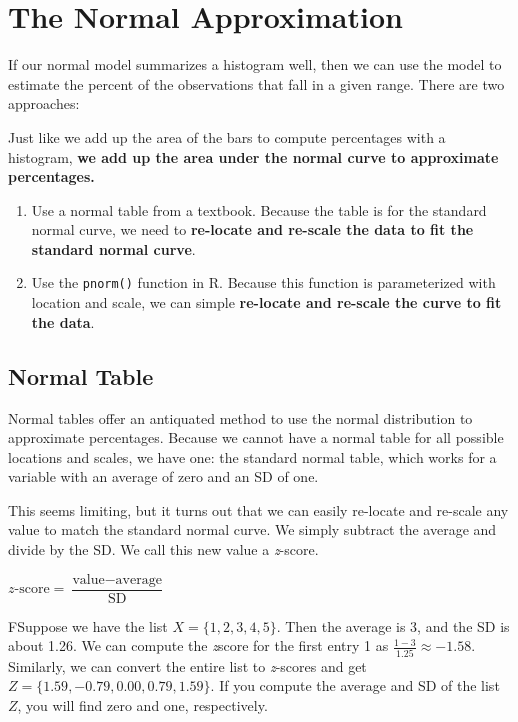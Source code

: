 \documentclass[]{book}
\providecommand{\tightlist}{%
  \setlength{\itemsep}{0pt}\setlength{\parskip}{0pt}}
\begin{document}
\hypertarget{the-normal-approximation}{%
\section{The Normal Approximation}\label{the-normal-approximation}}

If our normal model summarizes a histogram well, then we can use the model to estimate the percent of the observations that fall in a given range. There are two approaches:

Just like we add up the area of the bars to compute percentages with a histogram, \textbf{we add up the area under the normal curve to approximate percentages.}

\begin{enumerate}
\def\labelenumi{\arabic{enumi}.}
\tightlist
\item
  Use a normal table from a textbook. Because the table is for the standard normal curve, we need to \textbf{re-locate and re-scale the data to fit the standard normal curve}.
\item
  Use the \texttt{pnorm()} function in R. Because this function is parameterized with location and scale, we can simple \textbf{re-locate and re-scale the curve to fit the data}.
\end{enumerate}

\hypertarget{normal-table}{%
\subsection{Normal Table}\label{normal-table}}

Normal tables offer an antiquated method to use the normal distribution to approximate percentages. Because we cannot have a normal table for all possible locations and scales, we have one: the standard normal table, which works for a variable with an average of zero and an SD of one.

This seems limiting, but it turns out that we can easily re-locate and re-scale any value to match the standard normal curve. We simply subtract the average and divide by the SD. We call this new value a \emph{z}-score.

\(z\text{-score} = \dfrac{\text{value} - \text{average}}{\text{SD}}\)

FSuppose we have the list \(X = \{1, 2, 3, 4, 5\}\). Then the average is 3, and the SD is about 1.26. We can compute the \emph{z}score for the first entry 1 as \(\frac{1 - 3}{1.25} \approx -1.58\). Similarly, we can convert the entire list to \emph{z}-scores and get \(Z = \{1.59, -0.79, 0.00, 0.79, 1.59\}\). If you compute the average and SD of the list \(Z\), you will find zero and one, respectively.
\end{document}
